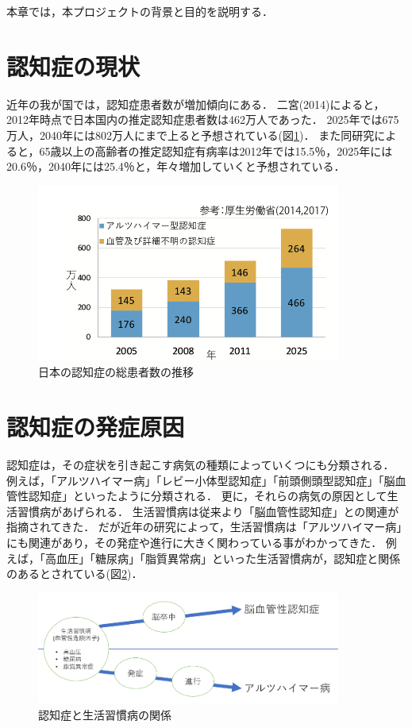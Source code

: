 \documentclass[../report]{subfiles}
\begin{document}
本章では，本プロジェクトの背景と目的を説明する．


\section{認知症の現状}
近年の我が国では，認知症患者数が増加傾向にある．
二宮(2014)によると，2012年時点で日本国内の推定認知症患者数は462万人であった\cite{syourai}．
2025年では675万人，2040年には802万人にまで上ると予想されている(図\ref{fig:ninchisyo-graph})．
また同研究によると，65歳以上の高齢者の推定認知症有病率は2012年では15.5％，2025年には20.6％，2040年には25.4％と，年々増加していくと予想されている\cite{syourai}．
\begin{figure}[htbp]
    \begin{center}
        \includegraphics[width=10cm]{imgs/1_ninchisyo-graph.png}
        \caption{日本の認知症の総患者数の推移}
        \label{fig:ninchisyo-graph}
    \end{center}
\end{figure}


\section{認知症の発症原因} \label{sec:cause}
認知症は，その症状を引き起こす病気の種類によっていくつにも分類される．
例えば，「アルツハイマー病」「レビー小体型認知症」「前頭側頭型認知症」「脳血管性認知症」といったように分類される．
更に，それらの病気の原因として生活習慣病があげられる．
生活習慣病は従来より「脳血管性認知症」との関連が指摘されてきた．
だが近年の研究によって，生活習慣病は「アルツハイマー病」にも関連があり，その発症や進行に大きく関わっている事がわかってきた\cite{seikatsu}．
例えば，「高血圧」「糖尿病」「脂質異常病」といった生活習慣病が，認知症と関係のあるとされている(図\ref{fig:relation-dementia-life-habit})．
\begin{figure}[htbp]
    \begin{center}
        \includegraphics[width=10cm]{imgs/1_relation-dementia-life-habit.png}
        \caption{認知症と生活習慣病の関係}
        \label{fig:relation-dementia-life-habit}
    \end{center}
\end{figure}
\end{document}
